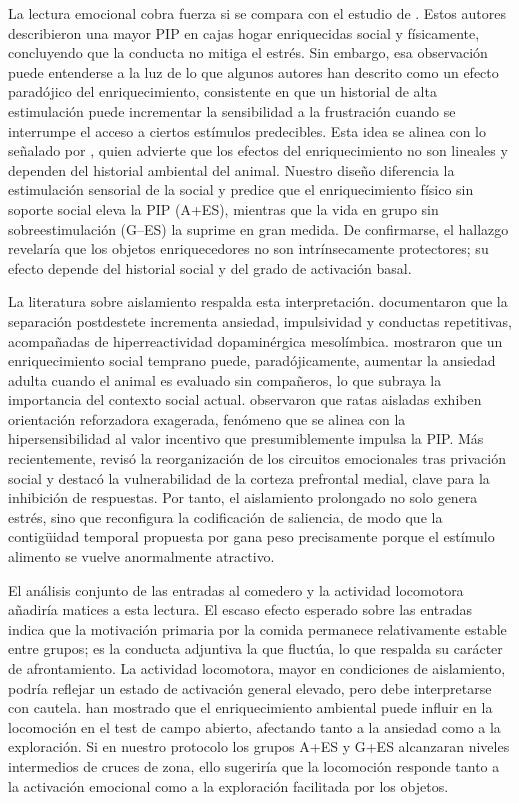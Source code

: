 \documentclass[12pt,a4paper]{article}
\begin{document}
\begin{multicols}{2}
La lectura emocional cobra fuerza si se compara con el estudio de \citet{FuentesVerdugo2023}. Estos autores describieron una mayor PIP en cajas hogar enriquecidas social y físicamente, concluyendo que la conducta no mitiga el estrés. Sin embargo, esa observación puede entenderse a la luz de lo que algunos autores han descrito como un efecto paradójico del enriquecimiento, consistente en que un historial de alta estimulación puede incrementar la sensibilidad a la frustración cuando se interrumpe el acceso a ciertos estímulos predecibles. Esta idea se alinea con lo señalado por \citet{Wurbel2001}, quien advierte que los efectos del enriquecimiento no son lineales y dependen del historial ambiental del animal. Nuestro diseño diferencia la estimulación sensorial de la social y predice que el enriquecimiento físico sin soporte social eleva la PIP (A+ES), mientras que la vida en grupo sin sobreestimulación (G--ES) la suprime en gran medida. De confirmarse, el hallazgo revelaría que los objetos enriquecedores no son intrínsecamente protectores; su efecto depende del historial social y del grado de activación basal.

La literatura sobre aislamiento respalda esta interpretación. \citet{Fone2008} documentaron que la separación postdestete incrementa ansiedad, impulsividad y conductas repetitivas, acompañadas de hiperreactividad dopaminérgica mesolímbica. \citet{Branchi2006} mostraron que un enriquecimiento social temprano puede, paradójicamente, aumentar la ansiedad adulta cuando el animal es evaluado sin compañeros, lo que subraya la importancia del contexto social actual. \citet{Robbins1989} observaron que ratas aisladas exhiben orientación reforzadora exagerada, fenómeno que se alinea con la hipersensibilidad al valor incentivo que presumiblemente impulsa la PIP. Más recientemente, \citet{Arakawa2018} revisó la reorganización de los circuitos emocionales tras privación social y destacó la vulnerabilidad de la corteza prefrontal medial, clave para la inhibición de respuestas. Por tanto, el aislamiento prolongado no solo genera estrés, sino que reconfigura la codificación de saliencia, de modo que la contigüidad temporal propuesta por \citet{Killeen2013} gana peso precisamente porque el estímulo alimento se vuelve anormalmente atractivo.

El análisis conjunto de las entradas al comedero y la actividad locomotora añadiría matices a esta lectura. El escaso efecto esperado sobre las entradas indica que la motivación primaria por la comida permanece relativamente estable entre grupos; es la conducta adjuntiva la que fluctúa, lo que respalda su carácter de afrontamiento. La actividad locomotora, mayor en condiciones de aislamiento, podría reflejar un estado de activación general elevado, pero debe interpretarse con cautela. \citet{seibenhener2015use} han mostrado que el enriquecimiento ambiental puede influir en la locomoción en el test de campo abierto, afectando tanto a la ansiedad como a la exploración. Si en nuestro protocolo los grupos A+ES y G+ES alcanzaran niveles intermedios de cruces de zona, ello sugeriría que la locomoción responde tanto a la activación emocional como a la exploración facilitada por los objetos.


\end{multicols}
\end{document}
